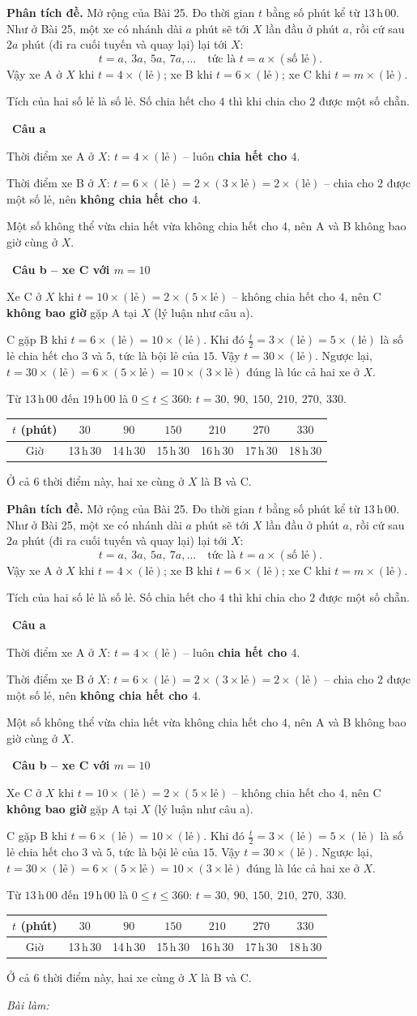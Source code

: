 \documentclass[11pt]{article}
\newif\ifsol \soltrue
\newcommand{\probsol}[1]{%
  \begin{lrbox}{\solmeasure}\begin{minipage}{\dimexpr\linewidth-24pt\relax}#1\end{minipage}\end{lrbox}%
  \ifsol
    \begin{solbox}#1\end{solbox}%
  \else
    \setlength{\solht}{\dimexpr\ht\solmeasure+\dp\solmeasure+0.85cm\relax}%
    \ifdim\solht<1.35cm\setlength{\solht}{1.35cm}\fi
    \ifdim\solht>\StudentMaxWork\setlength{\solht}{\StudentMaxWork}\fi
    \begin{tcolorbox}[colback=white,colframe=Line,boxrule=0.8pt,arc=5pt,
      left=8pt,right=8pt,top=4pt,bottom=4pt,height=\solht]{\footnotesize\color{Slate}\itshape\WorkWord}\end{tcolorbox}%
  \fi}
\newlength{\StudentMaxWork}\setlength{\StudentMaxWork}{7.5cm}
\newcommand{\step}[2]{\par\smallskip\noindent{\bfseries\color{tmBlue!85!black}\StepWord~#1.}\ {\bfseries #2}\par\nopagebreak}
\def\WorkWord{Bài làm:}
\def\StepWord{Bước}
\begin{document}
\probsol{
\textbf{Phân tích đề.} Mở rộng của Bài 25. Đo thời gian $t$ bằng số phút kể từ $13$\,h\,$00$. Như ở Bài 25, một xe có nhánh dài $a$ phút sẽ tới $X$ lần đầu ở phút $a$, rồi cứ sau $2a$ phút (đi ra cuối tuyến và quay lại) lại tới $X$:
\[ t=a,\ 3a,\ 5a,\ 7a,\dots \quad\text{tức là } t=a\times(\text{số lẻ}). \]
Vậy xe A ở $X$ khi $t=4\times(\text{lẻ})$; xe B khi $t=6\times(\text{lẻ})$; xe C khi $t=m\times(\text{lẻ})$.
\begin{recallbox}Tích của hai số lẻ là số lẻ. Số chia hết cho $4$ thì khi chia cho $2$ được một số chẵn.\end{recallbox}

\step{1}{Câu a}
Thời điểm xe A ở $X$: $t=4\times(\text{lẻ})$ -- luôn \textbf{chia hết cho $4$}.\par
Thời điểm xe B ở $X$: $t=6\times(\text{lẻ})=2\times(3\times\text{lẻ})=2\times(\text{lẻ})$ -- chia cho $2$ được một số lẻ, nên \textbf{không chia hết cho $4$}.\par
Một số không thể vừa chia hết vừa không chia hết cho $4$, nên A và B không bao giờ cùng ở $X$.

\step{2}{Câu b -- xe C với $m=10$}
Xe C ở $X$ khi $t=10\times(\text{lẻ})=2\times(5\times\text{lẻ})$ -- không chia hết cho $4$, nên C \textbf{không bao giờ} gặp A tại $X$ (lý luận như câu a).\par
C gặp B khi $t=6\times(\text{lẻ})=10\times(\text{lẻ})$. Khi đó $\frac{t}{2}=3\times(\text{lẻ})=5\times(\text{lẻ})$ là số lẻ chia hết cho $3$ và $5$, tức là bội lẻ của $15$. Vậy $t=30\times(\text{lẻ})$. Ngược lại, $t=30\times(\text{lẻ})=6\times(5\times\text{lẻ})=10\times(3\times\text{lẻ})$ đúng là lúc cả hai xe ở $X$.\par
Từ $13$\,h\,$00$ đến $19$\,h\,$00$ là $0\le t\le 360$: $t=30,\ 90,\ 150,\ 210,\ 270,\ 330$.
\begin{center}
\begin{tabular}{|c|c|c|c|c|c|c|}
\hline
\rowcolor{tmBlue!10}$t$ (phút) & $30$ & $90$ & $150$ & $210$ & $270$ & $330$\\ \hline
Giờ & 13\,h\,30 & 14\,h\,30 & 15\,h\,30 & 16\,h\,30 & 17\,h\,30 & 18\,h\,30\\ \hline
\end{tabular}
\end{center}
Ở cả $6$ thời điểm này, hai xe cùng ở $X$ là B và C.

}
\end{document}
